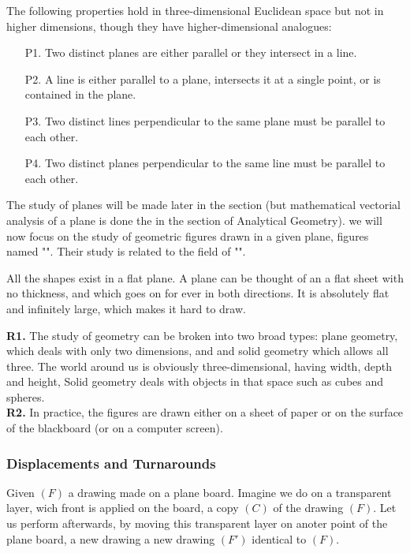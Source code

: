 	The following properties hold in three-dimensional Euclidean space but not in higher dimensions, though they have higher-dimensional analogues:
	\begin{enumerate}
		\item[P1.] Two distinct planes are either parallel or they intersect in a line.
		\item[P2.] A line is either parallel to a plane, intersects it at a single point, or is contained in the plane.
		\item[P3.] Two distinct lines perpendicular to the same plane must be parallel to each other.
		\item[P4.] Two distinct planes perpendicular to the same line must be parallel to each other.
	\end{enumerate}
	
	The study of planes will be made later in the section (but mathematical vectorial analysis of a plane is done the in the section of Analytical Geometry). we will now focus on the study of geometric figures drawn in a given plane, figures named "". Their study is related to the field of "".
	
	All the shapes exist in a flat plane. A plane can be thought of an a flat sheet with no thickness, and which goes on for ever in both directions. It is absolutely flat and infinitely large, which makes it hard to draw.
	
	\begin{tcolorbox}[title=Remarks,colframe=black,arc=10pt]
	\textbf{R1.} The study of geometry can be broken into two broad types: plane geometry, which deals with only two dimensions, and and solid geometry which allows all three. The world around us is obviously three-dimensional, having width, depth and height, Solid geometry deals with objects in that space such as cubes and spheres.\\
	
	\textbf{R2.} In practice, the figures are drawn either on a sheet of paper or on the surface of the blackboard (or on a computer screen).
	\end{tcolorbox}
	
	\subsubsection{Displacements and Turnarounds}
	Given $(F)$ a drawing made on a plane board. Imagine we do on a transparent layer, wich front  is applied on the board, a copy $(C)$ of the drawing $(F)$. Let us perform afterwards, by moving this transparent layer on anoter point of the plane board, a new drawing a new drawing $(F ')$ identical to $(F)$.
	

